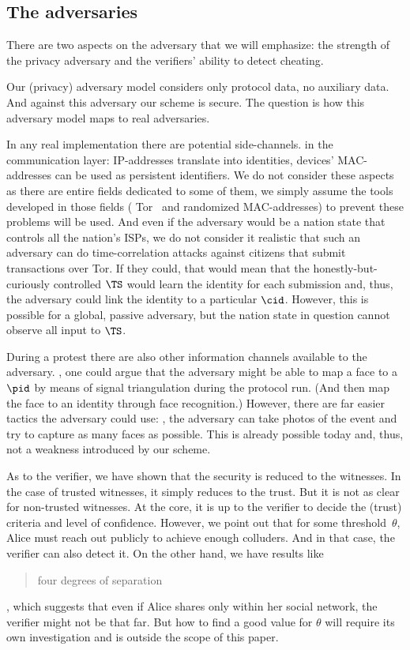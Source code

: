 


\subsection{The adversaries}

There are two aspects on the adversary that we will emphasize: the strength of 
the privacy adversary and the verifiers' ability to detect 
cheating.

Our (privacy) adversary model considers only protocol data, no auxiliary data.
And against this adversary our scheme is secure.
The question is how this adversary model maps to real adversaries.

In any real implementation there are potential side-channels.
\Eg in the communication layer: IP-addresses translate into identities, 
devices' MAC-addresses can be used as persistent identifiers.
We do not consider these aspects as there are entire fields dedicated to some 
of them, we simply assume the tools developed in those fields (\eg 
Tor~\cite{Tor} and randomized MAC-addresses) to prevent these problems will be 
used.
And even if the adversary would be a nation state that controls all the 
nation's \acp{ISP}, we do not consider it realistic that such an adversary can 
do \eg time-correlation attacks against citizens that submit transactions over 
Tor.
If they could, that would mean that the honestly-but-curiously controlled 
\(\TS\) would learn the identity for each submission and, thus, the adversary 
could link the identity to a particular \(\cid\).
However, this is possible for a global, passive adversary, but the nation state 
in question cannot observe all input to \(\TS\).

During a protest there are also other information channels available to the 
adversary.
\Eg, one could argue that the adversary might be able to map a face to a 
\(\pid\) by means of signal triangulation during the protocol run.
(And then map the face to an identity through face recognition.)
However, there are far easier tactics the adversary could use: \eg, the 
adversary can take photos of the event and try to capture as many faces as 
possible.
This is already possible today and, thus, not a weakness introduced by our 
scheme.

As to the verifier, we have shown that the security is reduced to the 
witnesses.
In the case of trusted witnesses, it simply reduces to the trust.
But it is not as clear for non-trusted witnesses.
At the core, it is up to the verifier to decide the (trust) criteria and level 
of confidence.
However, we point out that for some threshold~\(\theta\), Alice must reach out 
publicly to achieve enough colluders.
And in that case, the verifier can also detect it.
On the other hand, we have results like 
\blockcquote{FourDegreesOfSeparation}{four degrees of separation}, which 
suggests that even if Alice shares only within her social network, the verifier 
might not be that far.
But how to find a good value for \(\theta\) will require its own investigation 
and is outside the scope of this paper.

